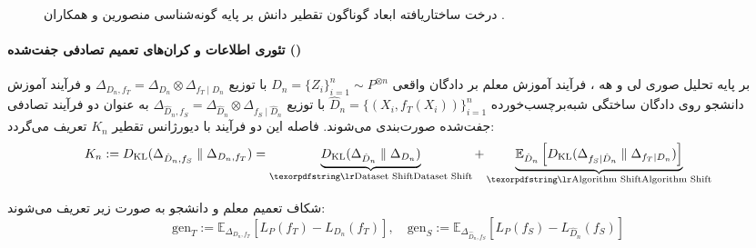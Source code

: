\begin{figure}[htbp]
\caption{درخت ساختاریافته ابعاد گوناگون تقطیر دانش بر پایه گونه‌شناسی منصورین و همکاران \cite{mansourian2025comprehensive}.}
\label{fig:kd_taxonomy_tree}
\end{figure}

\paragraph*{تئوری اطلاعات و کران‌های تعمیم تصادفی جفت‌شده ()}
بر پایه تحلیل صوری لی و هه \cite{li2026generalization}، فرآیند آموزش معلم بر دادگان واقعی $D_n = \{Z_i\}_{i=1}^n \sim P^{\otimes n}$ با توزیع $\Delta_{D_n, f_T} = \Delta_{D_n} \otimes \Delta_{f_T \mid D_n}$ و فرآیند آموزش دانشجو روی دادگان ساختگی شبه‌برچسب‌خورده $\hat{D}_n = \{(X_i, f_T(X_i))\}_{i=1}^n$ با توزیع $\Delta_{\hat{D}_n, f_S} = \Delta_{\hat{D}_n} \otimes \Delta_{f_S \mid \hat{D}_n}$ به عنوان دو فرآیند تصادفی جفت‌شده صورت‌بندی می‌شوند. فاصله این دو فرآیند با دیورژانس تقطیر $K_n$ تعریف می‌گردد:
\begin{equation}
    K_n := D_{\text{KL}}(\Delta_{\hat{D}_n, f_S} \parallel \Delta_{D_n, f_T}) = \underbrace{D_{\text{KL}}(\Delta_{\hat{D}_n} \parallel \Delta_{D_n})}_{\text{\en{Dataset Shift}}} + \underbrace{\mathbb{E}_{\hat{D}_n} \left[ D_{\text{KL}}(\Delta_{f_S \mid \hat{D}_n} \parallel \Delta_{f_T \mid D_n}) \right]}_{\text{\en{Algorithm Shift}}}
\end{equation}

شکاف تعمیم معلم و دانشجو به صورت زیر تعریف می‌شوند:
\begin{equation}
    \text{gen}_T := \mathbb{E}_{\Delta_{D_n, f_T}}[L_P(f_T) - L_{D_n}(f_T)], \quad \text{gen}_S := \mathbb{E}_{\Delta_{\hat{D}_n, f_S}}[L_P(f_S) - L_{\hat{D}_n}(f_S)]
\end{equation}

